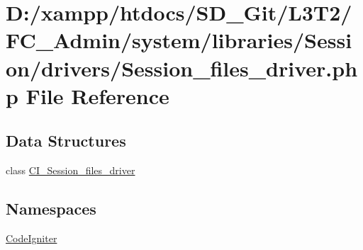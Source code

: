 \hypertarget{_session__files__driver_8php}{}\section{D\+:/xampp/htdocs/\+S\+D\+\_\+\+Git/\+L3\+T2/\+F\+C\+\_\+\+Admin/system/libraries/\+Session/drivers/\+Session\+\_\+files\+\_\+driver.php File Reference}
\label{_session__files__driver_8php}
\subsection*{Data Structures}
\begin{DoxyCompactItemize}
\item 
class \hyperlink{class_c_i___session__files__driver}{C\+I\+\_\+\+Session\+\_\+files\+\_\+driver}
\end{DoxyCompactItemize}
\subsection*{Namespaces}
\begin{DoxyCompactItemize}
\item 
 \hyperlink{namespace_code_igniter}{Code\+Igniter}
\end{DoxyCompactItemize}
